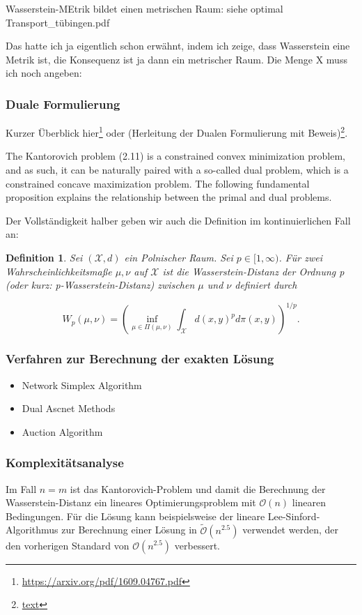 \documentclass[11pt,a4paper]{article}
\def\emph#1{\textit{#1}}
\newtheorem{definition}[theorem]{Definition}
\numberwithin{equation}{section}
\begin{document}
	Wasserstein-MEtrik bildet einen metrischen Raum: siehe optimal Transport\_tübingen.pdf
	
	Das hatte ich ja eigentlich schon erwähnt, indem ich zeige, dass Wasserstein eine Metrik ist, die Konsequenz ist ja dann ein metrischer Raum. Die  Menge X muss ich noch angeben:
	\subsubsection{Duale Formulierung}
	Kurzer Überblick hier\footnote{\url{https://arxiv.org/pdf/1609.04767.pdf}}
	oder (Herleitung der Dualen Formulierung mit Beweis)\footnote{\url{text}}.
	
	The Kantorovich problem (2.11) is a constrained convex minimization problem, and as
	such, it can be naturally paired with a so-called dual problem, which is a constrained
	concave maximization problem. The following fundamental proposition explains the
	relationship between the primal and dual problems.
	
	Der Vollständigkeit halber geben wir auch die Definition im kontinuierlichen Fall an:
	
	\begin{definition}\cite{villani2009optimal}
		Sei $(\mathcal{X},d)$ ein Polnischer Raum. Sei $p\in [1, \infty)$. Für zwei Wahrscheinlichkeitsmaße $\mu, \nu$ auf $\mathcal{X}$ ist die \emph{Wasserstein-Distanz der Ordnung p} (oder kurz: p-Wasserstein-Distanz) zwischen $\mu$ und $\nu$ definiert durch
		
		\begin{equation}
		W_p(\mu, \nu) = \left( \inf_{\mu \in \Pi(\mu, \nu)}\int_{\mathcal{X}}{d(x,y)^pd\pi(x,y)}\right) ^{1/p}.
		\end{equation}	
	\end{definition}
	\subsubsection{Verfahren zur Berechnung der exakten Lösung}
	\begin{itemize}
		\item Network Simplex Algorithm
		\item Dual Ascnet Methods
		\item Auction Algorithm
	\end{itemize}
	
	\subsubsection{Komplexitätsanalyse}
	Im Fall $n=m$ ist das Kantorovich-Problem und damit die Berechnung der Wasserstein-Distanz ein lineares Optimierungsproblem mit $\mathcal{O}(n)$ linearen Bedingungen. Für die Lösung kann beispielsweise der lineare Lee-Sinford-Algorithmus zur Berechnung einer Lösung in $\tilde{\mathcal{O}}(n^{2.5})$ \cite{lee2014path} verwendet werden, der den vorherigen Standard von $\mathcal{O}(n^{2.5})$ \cite{renegar1988polynomial} verbessert.
\end{document}
